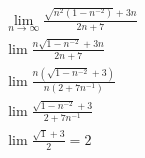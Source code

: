 
\begin{align}
	\lim_{n \rightarrow \infty} \frac{\sqrt{n^2(1 - n^{-2}) } + 3n}{2n + 7} \\
	\lim \frac{n\sqrt{1 - n^{-2}} + 3n}{2n + 7} \\
	\lim \frac{n(\sqrt{1 - n^{-2}} + 3)}{n(2 + 7n^{-1})} \\
	\lim \frac{\sqrt{1 - n^{-2}} + 3}{2 + 7n^{-1}} \\
	\lim \frac{\sqrt{1} + 3}{2} = 2
\end{align}

